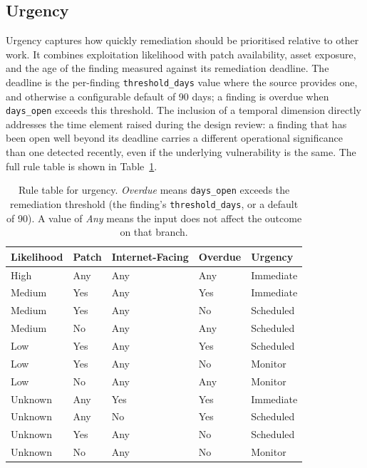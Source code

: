 \subsection{Urgency}
\label{subsec:urgency}

Urgency captures how quickly remediation should be prioritised relative to other work. It combines exploitation likelihood with patch availability, asset exposure, and the age of the finding measured against its remediation deadline. The deadline is the per-finding \texttt{threshold\_days} value where the source provides one, and otherwise a configurable default of 90 days; a finding is overdue when \texttt{days\_open} exceeds this threshold. The inclusion of a temporal dimension directly addresses the time element raised during the design review: a finding that has been open well beyond its deadline carries a different operational significance than one detected recently, even if the underlying vulnerability is the same. The full rule table is shown in Table~\ref{tab:urgency}.

\begin{table}[h]
\centering
\begin{tabular}{@{}lllll@{}}
\toprule
\textbf{Likelihood} & \textbf{Patch} & \textbf{Internet-Facing} & \textbf{Overdue} & \textbf{Urgency} \\
\midrule
High    & Any & Any & Any & Immediate \\
Medium  & Yes & Any & Yes & Immediate \\
Medium  & Yes & Any & No  & Scheduled \\
Medium  & No  & Any & Any & Scheduled \\
Low     & Yes & Any & Yes & Scheduled \\
Low     & Yes & Any & No  & Monitor \\
Low     & No  & Any & Any & Monitor \\
Unknown & Any & Yes & Yes & Immediate \\
Unknown & Any & No  & Yes & Scheduled \\
Unknown & Yes & Any & No  & Scheduled \\
Unknown & No  & Any & No  & Monitor \\
\bottomrule
\end{tabular}
\caption{Rule table for urgency. \emph{Overdue} means \texttt{days\_open} exceeds the remediation threshold (the finding's \texttt{threshold\_days}, or a default of 90). A value of \emph{Any} means the input does not affect the outcome on that branch.}
\label{tab:urgency}
\end{table}

